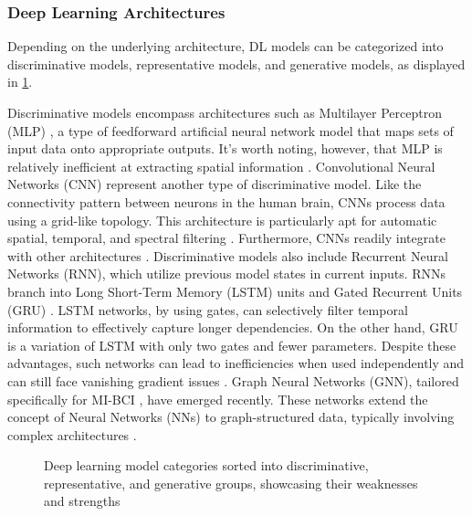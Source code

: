  
\subsubsection{Deep Learning Architectures}

Depending on the underlying architecture, DL models can be categorized into discriminative models, representative models, and generative models, as displayed in \cref{fig:sota2_DLA}. 

Discriminative models encompass architectures such as Multilayer Perceptron (MLP) \cite{amin2019deep}, a type of feedforward artificial neural network model that maps sets of input data onto appropriate outputs. It's worth noting, however, that MLP is relatively inefficient at extracting spatial information \cite{hossain2023status, altaheri2023deep}. Convolutional Neural Networks (CNN) \cite{zhang2021adaptive} represent another type of discriminative model. Like the connectivity pattern between neurons in the human brain, CNNs process data using a grid-like topology. This architecture is particularly apt for automatic spatial, temporal, and spectral filtering \cite{kollHod2023deep}. Furthermore, CNNs readily integrate with other architectures \cite{sharma2023recent}. Discriminative models also include Recurrent Neural Networks (RNN), which utilize previous model states in current inputs. RNNs branch into Long Short-Term Memory (LSTM) units \cite{kumar2019brain} and Gated Recurrent Units (GRU) \cite{luo2018exploring}. LSTM networks, by using gates, can selectively filter temporal information to effectively capture longer dependencies. On the other hand, GRU is a variation of LSTM with only two gates and fewer parameters. Despite these advantages, such networks can lead to inefficiencies when used independently \cite{kostiukevych2021convolutional} and can still face vanishing gradient issues \cite{gao2022parallel}. Graph Neural Networks (GNN), tailored specifically for MI-BCI \cite{ju2023graph}, have emerged recently. These networks extend the concept of Neural Networks (NNs) to graph-structured data, typically involving complex architectures \cite{kulatilleke2023towards}.

\begin{figure}[h!]
    \centering
        \caption{Deep learning model categories sorted into discriminative, representative, and generative groups, showcasing their weaknesses and strengths \label{fig:sota2_DLA}}
\end{figure}

